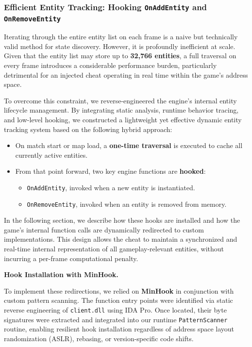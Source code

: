 \subsubsection{Efficient Entity Tracking: Hooking \texttt{OnAddEntity} and \texttt{OnRemoveEntity}}

Iterating through the entire entity list on each frame is a naive but technically valid method for state discovery. However, it is profoundly inefficient at scale.  
Given that the entity list may store up to \textbf{32,766 entities}, a full traversal on every frame introduces a considerable performance burden, particularly detrimental for an injected cheat operating in real time within the game’s address space.

To overcome this constraint, we reverse-engineered the engine’s internal entity lifecycle management.  
By integrating static analysis, runtime behavior tracing, and low-level hooking, we constructed a lightweight yet effective dynamic entity tracking system based on the following hybrid approach:

\begin{itemize}
    \item On match start or map load, a \textbf{one-time traversal} is executed to cache all currently active entities.
    \item From that point forward, two key engine functions are \textbf{hooked}:
    \begin{itemize}
        \item \texttt{OnAddEntity}, invoked when a new entity is instantiated.
        \item \texttt{OnRemoveEntity}, invoked when an entity is removed from memory.
    \end{itemize}
\end{itemize}

In the following section, we describe how these hooks are installed and how the game’s internal function calls are dynamically redirected to custom implementations.  
This design allows the cheat to maintain a synchronized and real-time internal representation of all gameplay-relevant entities, without incurring a per-frame computational penalty.


\newpage


\noindent\textbf{Hook Installation with MinHook.}

To implement these redirections, we relied on \textbf{MinHook} in conjunction with custom pattern scanning.  
The function entry points were identified via static reverse engineering of \texttt{client.dll} using IDA Pro. Once located, their byte signatures were extracted and integrated into our runtime \texttt{PatternScanner} routine, enabling resilient hook installation regardless of address space layout randomization (ASLR), rebasing, or version-specific code shifts.

